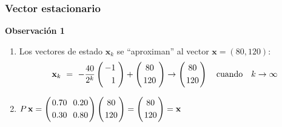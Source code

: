{\nologo
\begin{frame}\frametitle{Vector estacionario}
	
	\vspace{-3mm}
	\begin{alertblock}{\textbf{Observación 1}}
		\begin{enumerate}[$a$]
			\item Los vectores de estado $\mathbf{x}_k$ se ``aproximan'' al vector $\mathbf{x}=(80, 120)$:
			\[
			\mathbf{x}_{k}
			\ = \
			-\frac{40}{2^{k}}
			\left(
			\begin{array}{@{\hspace{0.3\tabcolsep}}r@{\hspace{0.5\tabcolsep}}}
			-1   \\[1mm]
			1 
			\end{array}
			\right) 
			+		
			\left(
			\begin{array}{@{\hspace{0.3\tabcolsep}}c@{\hspace{0.5\tabcolsep}}}
			80  \\[1mm]
			120 
			\end{array}
			\right) 
			\to 
			\left(
			\begin{array}{@{\hspace{0.2\tabcolsep}}c@{\hspace{0.2\tabcolsep}}}
			80 \\[1mm]
			120
			\end{array}
			\right)
			\quad \text{cuando} \quad k\to \infty
			\]
			
			\vspace{0mm}
			\item $P\,\mathbf{x} = 
			\left(
			\begin{array}{@{\hspace{0.2\tabcolsep}}c@{\hspace{1.2\tabcolsep}}c@{\hspace{0.2\tabcolsep}}}
			0.70 & 0.20 \\[1mm]
			0.30 & 0.80
			\end{array}
			\right)
			\left(
			\begin{array}{@{\hspace{0.2\tabcolsep}}c@{\hspace{0.2\tabcolsep}}}
			80 \\[1mm]
			120
			\end{array}
			\right)
			=
			\left(
			\begin{array}{@{\hspace{0.2\tabcolsep}}c@{\hspace{0.2\tabcolsep}}}
			80 \\[1mm]
			120
			\end{array}
			\right)
			= \mathbf{x}$
		\end{enumerate}	
	\end{alertblock}	
	

\end{frame}}
